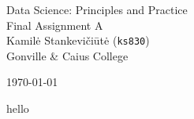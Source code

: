 \documentclass[12pt]{article}
\begin{document}
\thispagestyle{first}
\pagestyle{plain}

\begin{center}
\LARGE
Data Science: Principles and Practice \\ Final Assignment A \\[4mm]

\large
Kamilė Stankevičiūtė (\texttt{ks830}) \\ Gonville \& Caius College

\today %
\end{center}

\newpage
hello
\end{document}
